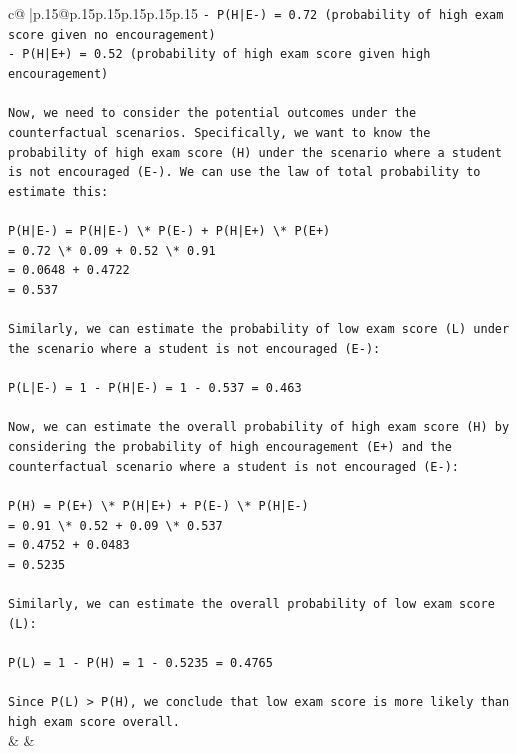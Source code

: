 \documentclass{article}
\begin{document}
{\begin{supertabular}{c@{$\;$}|p{.15\linewidth}@{}p{.15\linewidth}p{.15\linewidth}p{.15\linewidth}p{.15\linewidth}p{.15\linewidth}}
{{{\texttt{{-} P(H|E{-}) = 0.72 (probability of high exam score given no encouragement)} \\
\texttt{{-} P(H|E+) = 0.52 (probability of high exam score given high encouragement)} \\
\\ 
\texttt{Now, we need to consider the potential outcomes under the counterfactual scenarios. Specifically, we want to know the probability of high exam score (H) under the scenario where a student is not encouraged (E{-}). We can use the law of total probability to estimate this:} \\
\\ 
\texttt{P(H|E{-}) = P(H|E{-}) \textbackslash{}* P(E{-}) + P(H|E+) \textbackslash{}* P(E+)} \\
\texttt{= 0.72 \textbackslash{}* 0.09 + 0.52 \textbackslash{}* 0.91} \\
\texttt{= 0.0648 + 0.4722} \\
\texttt{= 0.537} \\
\\ 
\texttt{Similarly, we can estimate the probability of low exam score (L) under the scenario where a student is not encouraged (E{-}):} \\
\\ 
\texttt{P(L|E{-}) = 1 {-} P(H|E{-}) = 1 {-} 0.537 = 0.463} \\
\\ 
\texttt{Now, we can estimate the overall probability of high exam score (H) by considering the probability of high encouragement (E+) and the counterfactual scenario where a student is not encouraged (E{-}):} \\
\\ 
\texttt{P(H) = P(E+) \textbackslash{}* P(H|E+) + P(E{-}) \textbackslash{}* P(H|E{-})} \\
\texttt{= 0.91 \textbackslash{}* 0.52 + 0.09 \textbackslash{}* 0.537} \\
\texttt{= 0.4752 + 0.0483} \\
\texttt{= 0.5235} \\
\\ 
\texttt{Similarly, we can estimate the overall probability of low exam score (L):} \\
\\ 
\texttt{P(L) = 1 {-} P(H) = 1 {-} 0.5235 = 0.4765} \\
\\ 
\texttt{Since P(L) > P(H), we conclude that low exam score is more likely than high exam score overall.} \\
            }
        }
    }
    & & \\ \\


\end{supertabular}}
\end{document}
